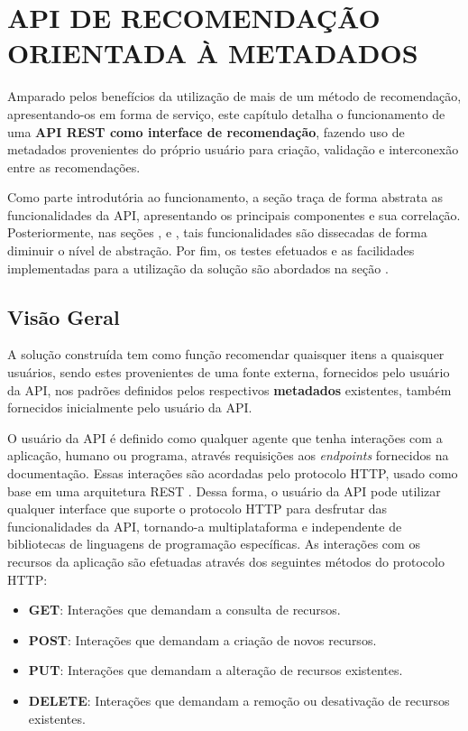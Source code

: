 \chapter{API DE RECOMENDAÇÃO ORIENTADA À METADADOS}

Amparado pelos benefícios da utilização de mais de um método de recomendação, apresentando-os em forma de serviço, este capítulo detalha o funcionamento de uma \textbf{API REST como interface de recomendação}, fazendo uso de metadados provenientes do próprio usuário para criação, validação e interconexão entre as recomendações.

Como parte introdutória ao funcionamento, a seção  traça de forma abstrata as funcionalidades da API, apresentando os principais componentes e sua correlação. Posteriormente, nas seções ,  e , tais funcionalidades são dissecadas de forma diminuir o nível de abstração. Por fim, os testes efetuados e as facilidades implementadas para a utilização da solução são abordados na seção .

\section{Visão Geral} \label{visao_geral}

A solução construída tem como função recomendar quaisquer itens a quaisquer usuários, sendo estes provenientes de uma fonte externa, fornecidos pelo usuário da API, nos padrões definidos pelos respectivos \textbf{metadados} existentes, também fornecidos inicialmente pelo usuário da API.

O usuário da API é definido como qualquer agente que tenha interações com a aplicação, humano ou programa, através requisições aos \textit{endpoints} fornecidos na documentação. Essas interações são acordadas pelo protocolo HTTP, usado como base em uma arquitetura REST \cite{rodriguez2008restful}. Dessa forma, o usuário da API pode utilizar qualquer interface que suporte o protocolo HTTP para desfrutar das funcionalidades da API, tornando-a multiplataforma e independente de bibliotecas de linguagens de programação específicas. As interações com os recursos da aplicação são efetuadas através dos seguintes métodos do protocolo HTTP:

\begin{itemize}
	\item \textbf{GET}: Interações que demandam a consulta de recursos.

	\item \textbf{POST}: Interações que demandam a criação de novos recursos.

	\item \textbf{PUT}: Interações que demandam a alteração de recursos existentes.

	\item \textbf{DELETE}: Interações que demandam a remoção ou desativação de recursos existentes.
\end{itemize}

